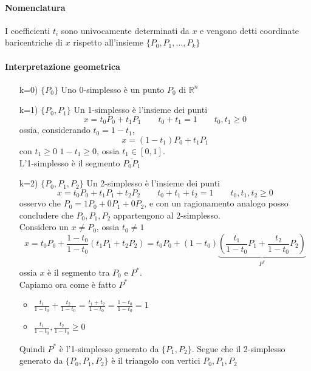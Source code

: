 \documentclass[a4paper]{report}
\newcommand{\R}{\ensuremath{\mathbb{R}}}
\newcommand{\pointset}{\ensuremath{\{P_0,P_1,\dots,P_k\}} }
\begin{document}
\paragraph{Nomenclatura} I coefficienti $t_i$ sono univocamente determinati da $x$ e vengono detti coordinate baricentriche di $x$ rispetto all'insieme \pointset
\paragraph{Interpretazione geometrica}
\begin{enumerate}
    \item[k=0)] $\{P_0\}$ Uno 0-simplesso è un punto $P_0$ di $\R^n$
    \item[k=1)] $\{P_0,P_1\}$ Un 1-simplesso è l'insieme dei punti
        \[
            x=t_0P_0+t_1P_1\quad\quad t_0+t_1=1\quad\quad t_0,t_1\geq 0
        \]
        ossia, considerando $t_0=1-t_1$,
        \[
            x=(1-t_1)P_0+t_1P_1
        \]
        con $t_1\geq 0$ $1-t_1\geq 0$, ossia $t_1\in[0,1]$.\\
        L'1-simplesso è il segmento $\overline{P_0P_1}$
    \item[k=2)] $\{P_0,P_1,P_2\}$ Un 2-simplesso è l'insieme dei punti
        \[
            x=t_0P_0+t_1P_1+t_2P_2\quad\quad t_0+t_1+t_2=1\quad\quad t_0,t_1,t_2\geq 0
        \]
        osservo che $P_0=1P_0+0P_1+0P_2$, e con un ragionamento analogo posso concludere che $P_0,P_1,P_2$ appartengono al 2-simplesso.\\
        Considero un $x\neq P_0$, ossia $t_0\neq 1$
        \[
            x=t_0P_0+\frac{1-t_0}{1-t_0}(t_1P_1+t_2P_2)=t_0P_0+(1-t_0)\underbrace{\left(\frac{t_1}{1-t_0}P_1+\frac{t_2}{1-t_0}P_2\right)}_{P^*}
        \]
        ossia $x$ è il segmento tra $P_0$ e $P^*$.\\
        Capiamo ora come è fatto $P^*$
        \begin{itemize}
            \item $\frac{t_1}{1-t_0}+\frac{t_2}{1-t_0}=\frac{t_1+t_2}{1-t_0}=\frac{1-t_0}{1-t_0}=1$
            \item $\frac{t_1}{1-t_0},\frac{t_2}{1-t_0}\geq 0$
        \end{itemize}
        Quindi $P^*$ è l'1-simplesso generato da $\{P_1,P_2\}$. Segue che il 2-simplesso generato da $\{P_0,P_1,P_2\}$ è il triangolo con vertici $P_0,P_1,P_2$
        \begin{center}




\end{center}
\end{enumerate}
\end{document}
